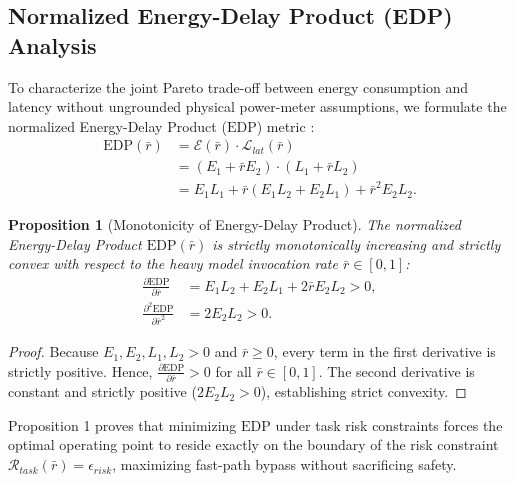 \documentclass[conference]{IEEEtran}
\newtheorem{proposition}{Proposition}
\begin{document}
\subsection{Normalized Energy-Delay Product (EDP) Analysis}
To characterize the joint Pareto trade-off between energy consumption and latency without ungrounded physical power-meter assumptions, we formulate the normalized Energy-Delay Product ($\mathrm{EDP}$) metric \cite{gonzalez1997energy}:
\begin{align}
\mathrm{EDP}(\bar{r}) &= \mathcal{E}(\bar{r}) \cdot \mathcal{L}_{lat}(\bar{r}) \nonumber \\
&= \left( E_1 + \bar{r} E_2 \right) \cdot \left( L_1 + \bar{r} L_2 \right) \nonumber \\
&= E_1 L_1 + \bar{r} (E_1 L_2 + E_2 L_1) + \bar{r}^2 E_2 L_2.
\end{align}

\begin{proposition}[Monotonicity of Energy-Delay Product]
The normalized Energy-Delay Product $\mathrm{EDP}(\bar{r})$ is strictly monotonically increasing and strictly convex with respect to the heavy model invocation rate $\bar{r} \in [0, 1]$:
\begin{align}
\frac{\partial \mathrm{EDP}}{\partial \bar{r}} &= E_1 L_2 + E_2 L_1 + 2 \bar{r} E_2 L_2 > 0, \\
\frac{\partial^2 \mathrm{EDP}}{\partial \bar{r}^2} &= 2 E_2 L_2 > 0.
\end{align}
\end{proposition}

\begin{proof}
Because $E_1, E_2, L_1, L_2 > 0$ and $\bar{r} \ge 0$, every term in the first derivative is strictly positive. Hence, $\frac{\partial \mathrm{EDP}}{\partial \bar{r}} > 0$ for all $\bar{r} \in [0, 1]$. The second derivative is constant and strictly positive ($2 E_2 L_2 > 0$), establishing strict convexity.
\end{proof}

Proposition 1 proves that minimizing $\mathrm{EDP}$ under task risk constraints forces the optimal operating point to reside exactly on the boundary of the risk constraint $\mathcal{R}_{task}(\bar{r}) = \epsilon_{risk}$, maximizing fast-path bypass without sacrificing safety.
\end{document}
